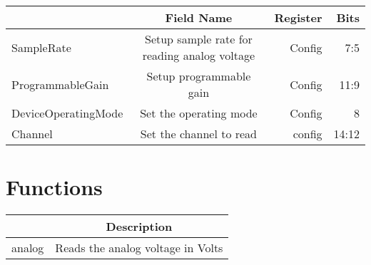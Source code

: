 \documentclass[a4paper,12pt,oneside,pdflatex,italian,final,twocolumn]{article}
\begin{document}
\centering
\begin{tabular}{lcrr}
\toprule
  & Field Name & Register & Bits \\
\midrule
SampleRate & Setup sample rate for reading analog voltage & Config &
7:5
\\

ProgrammableGain & Setup programmable gain & Config &
11:9
\\

DeviceOperatingMode & Set the operating mode & Config &
8
\\

Channel & Set the channel to read & config &
14:12
\\

\bottomrule
\end{tabular}

\raggedright


\section{Functions}

\centering
\begin{tabular}{lc}
\toprule
  & Description \\
\midrule
analog & Reads the analog voltage in Volts \\
\bottomrule
\end{tabular}

\raggedright
\end{document}
